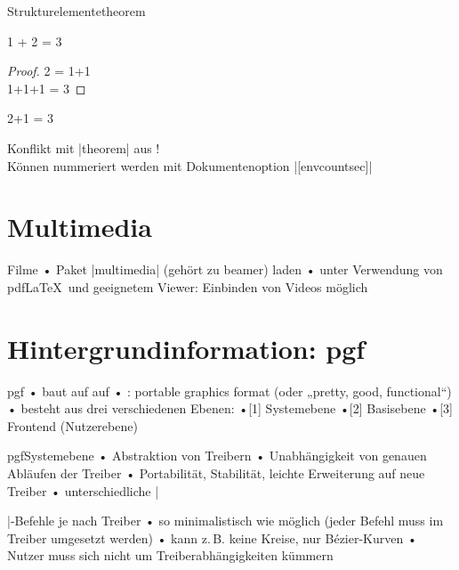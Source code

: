 \begin{frame}[fragile]{Strukturelemente}{theorem}
\begin{LTXexample}
\begin{theorem}[Trautmann et al. 2010]
1 + 2 = 3
\end{theorem}
\begin{proof}
2 = 1+1\\
1+1+1 = 3
\end{proof}
\begin{example}
2+1 = 3
\end{example}
\end{LTXexample}
Konflikt mit |theorem| aus !\\
Können nummeriert werden mit Dokumentenoption |[envcountsec]|
\end{frame}

\section{Multimedia}

\begin{frame}{Filme}
• Paket |multimedia| (gehört zu beamer) laden
• unter Verwendung von pdf\LaTeX\ und geeignetem Viewer: Einbinden von Videos möglich
\•
\end{frame}

\section{Hintergrundinformation: pgf}
\begin{frame}{pgf}
•  baut auf  auf
• : portable graphics format (oder „pretty, good, functional“)
•  besteht aus drei verschiedenen Ebenen:
•[1] Systemebene
•[2] Basisebene
•[3] Frontend (Nutzerebene)
\•
\end{frame}

\begin{frame}[fragile]{pgf}{Systemebene}
• Abstraktion von Treibern
• Unabhängigkeit von genauen Abläufen der Treiber
• Portabilität, Stabilität, leichte Erweiterung auf neue Treiber
• unterschiedliche |\special|-Befehle je nach Treiber
• so minimalistisch wie möglich (jeder Befehl muss im Treiber umgesetzt werden)
• kann z.\,B. keine Kreise, nur Bézier-Kurven
• Nutzer muss sich nicht um Treiberabhängigkeiten kümmern
\•
\end{frame}

